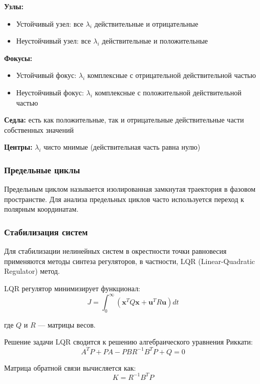 \textbf{Узлы:}
\begin{itemize}
\item Устойчивый узел: все $\lambda_i$ действительные и отрицательные
\item Неустойчивый узел: все $\lambda_i$ действительные и положительные
\end{itemize}

\textbf{Фокусы:}
\begin{itemize}
\item Устойчивый фокус: $\lambda_i$ комплексные с отрицательной действительной частью
\item Неустойчивый фокус: $\lambda_i$ комплексные с положительной действительной частью
\end{itemize}

\textbf{Седла:} есть как положительные, так и отрицательные действительные части собственных значений

\textbf{Центры:} $\lambda_i$ чисто мнимые (действительная часть равна нулю)

\subsubsection*{Предельные циклы}

Предельным циклом называется изолированная замкнутая траектория в фазовом пространстве. Для анализа предельных циклов часто используется переход к полярным координатам.

\subsubsection*{Стабилизация систем}

Для стабилизации нелинейных систем в окрестности точки равновесия применяются методы синтеза регуляторов, в частности, LQR (Linear-Quadratic Regulator) метод.

LQR регулятор минимизирует функционал:
$$J = \int_0^{\infty} (\mathbf{x}^T Q \mathbf{x} + \mathbf{u}^T R \mathbf{u}) dt$$

где $Q$ и $R$ --- матрицы весов.

Решение задачи LQR сводится к решению алгебраического уравнения Риккати:
$$A^T P + PA - PBR^{-1}B^T P + Q = 0$$

Матрица обратной связи вычисляется как:
$$K = R^{-1}B^T P$$
